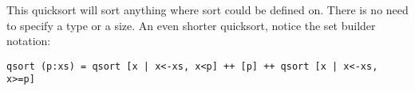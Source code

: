 \documentclass[presentation.tex]{subfiles}
\begin{document}
\vspace{\baselineskip}
This quicksort will sort anything where sort could be defined on. There is no need to specify a type or a size.
\vspace{\baselineskip}
An even shorter quicksort, notice the set builder notation:
\scriptsize
\begin{verbatim}
qsort (p:xs) = qsort [x | x<-xs, x<p] ++ [p] ++ qsort [x | x<-xs, x>=p]
\end{verbatim}
\large
\end{document}
